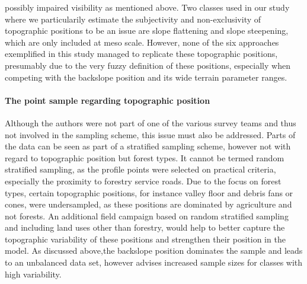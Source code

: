 \documentclass[preprint,12pt,authoryear]{elsarticle}
\begin{document}
possibly impaired visibility as mentioned above. Two classes used in our study where we particularily estimate the subjectivity and non-exclusivity of topographic positions to be  an issue are slope flattening and slope steepening, which are only included at meso scale. However, none of the six approaches exemplified in this study managed to replicate these topographic positions, presumably due to the very fuzzy definition of these positions, especially when competing with the backslope position and its wide terrain parameter ranges.
\paragraph{The point sample regarding topographic position}
Although the authors were not part of one of the various survey teams and thus not involved in the sampling scheme, this issue must also be addressed. Parts of the data can be seen as part of a stratified sampling scheme, however not with regard to topographic position but forest types. It cannot be termed random stratified sampling, as the profile points were selected on practical criteria, especially the proximity to forestry service roads. Due to the focus on forest types, certain topographic positions, for instance valley floor and debris fans or cones, were undersampled, as these positions are dominated by agriculture and not forests. An additional field campaign based on random stratified sampling and including land uses other than forestry, would help to better capture the topographic variability of these positions and strengthen their position in the model. As discussed above,the backslope position dominates the sample and leads to an unbalanced data set, however \cite{Congalton1991} advises increased sample sizes for classes with high variability.
\end{document}
